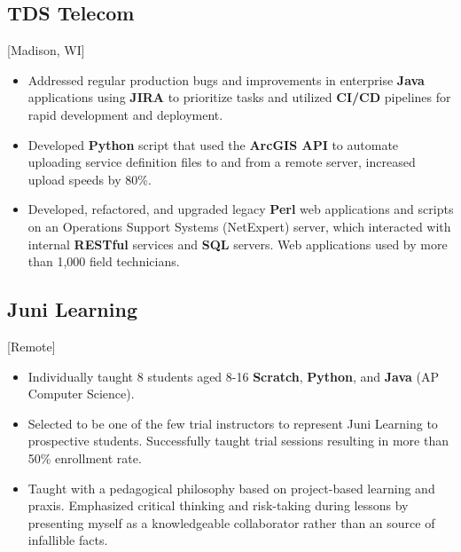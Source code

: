 \documentclass{mycv}
\begin{document}
\subsection{TDS Telecom}[Madison, WI]
\begin{positions}
\end{positions}
\begin{itemize}
  \item {
  Addressed regular production bugs and improvements in enterprise \textbf{Java}
applications using \textbf{JIRA} to prioritize tasks and utilized \textbf{CI/CD} pipelines for
rapid development and deployment.
  }
  \item {
  Developed \textbf{Python} script that used the \textbf{ArcGIS API} to automate uploading
service definition files to and from a remote server, increased upload speeds
by 80\%.
}
  \item {
  Developed, refactored, and upgraded legacy \textbf{Perl} web applications and scripts
on an Operations Support Systems (NetExpert) server, which interacted with
internal \textbf{RESTful} services and \textbf{SQL} servers. Web applications used by more than 1,000
field technicians.
  }
\end{itemize}


\subsection{Juni Learning}[Remote]
\begin{positions}
\end{positions}
\begin{itemize}
  \item {
  Individually taught 8 students aged 8-16 \textbf{Scratch}, \textbf{Python}, and \textbf{Java} (AP Computer Science). 
  }
  \item{
    Selected to be one of the few trial instructors to represent Juni Learning to prospective students.
  Successfully taught trial sessions resulting in more than 50\% enrollment rate.
  }
  \item{
    Taught with a pedagogical philosophy based on project-based learning and praxis.
    Emphasized critical thinking and risk-taking during lessons by presenting myself as a
    knowledgeable collaborator rather than an source of infallible facts. 
  }
\end{itemize}
\end{document}
